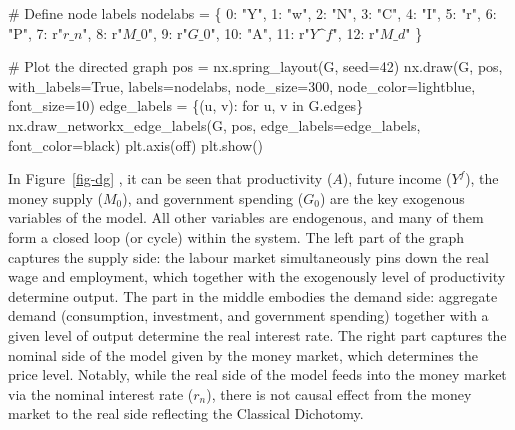\documentclass[
  letterpaper,
  DIV=11,
  numbers=noendperiod]{scrreprt}
\newenvironment{Shaded}{\begin{snugshade}}{\end{snugshade}}
\newcommand{\CommentTok}[1]{\textcolor[rgb]{0.37,0.37,0.37}{#1}}
\newcommand{\ControlFlowTok}[1]{\textcolor[rgb]{0.00,0.23,0.31}{#1}}
\newcommand{\DecValTok}[1]{\textcolor[rgb]{0.68,0.00,0.00}{#1}}
\newcommand{\KeywordTok}[1]{\textcolor[rgb]{0.00,0.23,0.31}{#1}}
\newcommand{\NormalTok}[1]{\textcolor[rgb]{0.00,0.23,0.31}{#1}}
\newcommand{\OperatorTok}[1]{\textcolor[rgb]{0.37,0.37,0.37}{#1}}
\newcommand{\StringTok}[1]{\textcolor[rgb]{0.13,0.47,0.30}{#1}}
\newcommand{\VariableTok}[1]{\textcolor[rgb]{0.07,0.07,0.07}{#1}}
\newcommand{\VerbatimStringTok}[1]{\textcolor[rgb]{0.13,0.47,0.30}{#1}}
\begin{document}
\begin{tcolorbox}
\begin{Shaded}
\begin{Highlighting}[]
\CommentTok{\# Define node labels}
\NormalTok{nodelabs }\OperatorTok{=}\NormalTok{ \{}
    \DecValTok{0}\NormalTok{: }\StringTok{"Y"}\NormalTok{,}
    \DecValTok{1}\NormalTok{: }\StringTok{"w"}\NormalTok{,}
    \DecValTok{2}\NormalTok{: }\StringTok{"N"}\NormalTok{,}
    \DecValTok{3}\NormalTok{: }\StringTok{"C"}\NormalTok{,}
    \DecValTok{4}\NormalTok{: }\StringTok{"I"}\NormalTok{,}
    \DecValTok{5}\NormalTok{: }\StringTok{"r"}\NormalTok{,}
    \DecValTok{6}\NormalTok{: }\StringTok{"P"}\NormalTok{,}
    \DecValTok{7}\NormalTok{: }\VerbatimStringTok{r"$r\_n$"}\NormalTok{,}
    \DecValTok{8}\NormalTok{: }\VerbatimStringTok{r"$M\_0$"}\NormalTok{,}
    \DecValTok{9}\NormalTok{: }\VerbatimStringTok{r"$G\_0$"}\NormalTok{,}
    \DecValTok{10}\NormalTok{: }\StringTok{"A"}\NormalTok{,}
    \DecValTok{11}\NormalTok{: }\VerbatimStringTok{r"$Y\^{}f$"}\NormalTok{,}
    \DecValTok{12}\NormalTok{: }\VerbatimStringTok{r"$M\_d$"}
\NormalTok{\}}

\CommentTok{\# Plot the directed graph}
\NormalTok{pos }\OperatorTok{=}\NormalTok{ nx.spring\_layout(G, seed}\OperatorTok{=}\DecValTok{42}\NormalTok{)  }
\NormalTok{nx.draw(G, pos, with\_labels}\OperatorTok{=}\VariableTok{True}\NormalTok{, labels}\OperatorTok{=}\NormalTok{nodelabs, node\_size}\OperatorTok{=}\DecValTok{300}\NormalTok{, node\_color}\OperatorTok{=}\StringTok{\textquotesingle{}lightblue\textquotesingle{}}\NormalTok{, }
\NormalTok{        font\_size}\OperatorTok{=}\DecValTok{10}\NormalTok{)}
\NormalTok{edge\_labels }\OperatorTok{=}\NormalTok{ \{(u, v): }\StringTok{\textquotesingle{}\textquotesingle{}} \ControlFlowTok{for}\NormalTok{ u, v }\KeywordTok{in}\NormalTok{ G.edges\}}
\NormalTok{nx.draw\_networkx\_edge\_labels(G, pos, edge\_labels}\OperatorTok{=}\NormalTok{edge\_labels, font\_color}\OperatorTok{=}\StringTok{\textquotesingle{}black\textquotesingle{}}\NormalTok{)}
\NormalTok{plt.axis(}\StringTok{\textquotesingle{}off\textquotesingle{}}\NormalTok{)}
\NormalTok{plt.show()}
\end{Highlighting}
\end{Shaded}

\end{tcolorbox}

In Figure~\ref{fig-dg} , it can be seen that productivity (\(A\)),
future income (\(Y^f\)), the money supply (\(M_0\)), and government
spending (\(G_0\)) are the key exogenous variables of the model. All
other variables are endogenous, and many of them form a closed loop (or
cycle) within the system. The left part of the graph captures the supply
side: the labour market simultaneously pins down the real wage and
employment, which together with the exogenously level of productivity
determine output. The part in the middle embodies the demand side:
aggregate demand (consumption, investment, and government spending)
together with a given level of output determine the real interest rate.
The right part captures the nominal side of the model given by the money
market, which determines the price level. Notably, while the real side
of the model feeds into the money market via the nominal interest rate
(\(r_n\)), there is not causal effect from the money market to the real
side reflecting the Classical Dichotomy.
\end{document}
